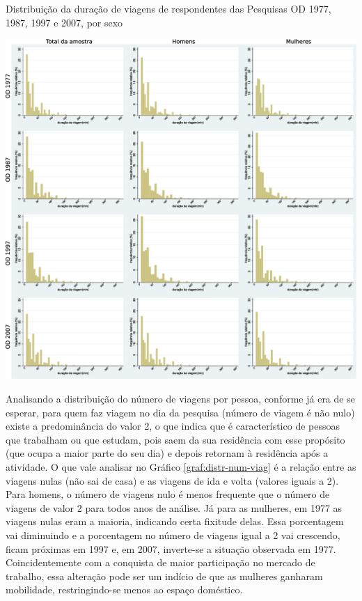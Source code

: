 \begin{grafico}[htb]%
    \caption{\label{graf:distr-dur-viag}Distribuição da duração de viagens de respondentes das Pesquisas OD 1977, 1987, 1997 e 2007, por sexo}%
    \begin{center}%
        \includegraphics[width=1.1\textwidth]{./imagens/duradeviagens2.eps}%
    \end{center}%
\end{grafico}%

\clearpage
Analisando a distribuição do número de viagens por pessoa, conforme já era de se esperar, para quem faz viagem no dia da pesquisa (número de viagem é não nulo) existe a predominância do valor 2, o que indica que é característico de pessoas que trabalham ou que estudam, pois saem da sua residência com esse propósito (que ocupa a maior parte do seu dia) e depois retornam à residência após a atividade. O que vale analisar no Gráfico \ref{graf:distr-num-viag} é a relação entre as viagens nulas (não sai de casa) e as viagens de ida e volta (valores iguais a 2). Para homens, o número de viagens nulo é menos frequente que o número de viagens de valor 2 para todos anos de análise. Já para as mulheres, em 1977 as viagens nulas eram a maioria, indicando certa fixitude delas. Essa porcentagem vai diminuindo e a porcentagem no número de viagens igual a 2 vai crescendo, ficam próximas em 1997 e, em 2007, inverte-se a situação observada em 1977. Coincidentemente com a conquista de maior participação no mercado de trabalho, essa alteração pode ser um indício de que as mulheres ganharam mobilidade, restringindo-se menos ao espaço doméstico.

